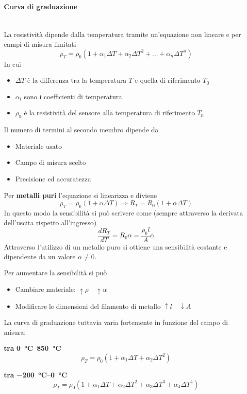 \documentclass[a4paper, 15pt]{article}
\begin{document}
\begin{adjustwidth}{2in}{}
	\paragraph{Curva di graduazione} \mbox{} \\
	La resistività dipende dalla temperatura tramite un'equazione non lineare e per campi di misura limitati
	\[\rho_T = \rho_0(1+\alpha_1\Delta T + \alpha_2 \Delta T^2 + \dots + \alpha_n \Delta T^n)\]
	In cui 
	\begin{itemize}
		\item $\Delta T$ è la differenza tra la temperatura $T$ e quella di riferimento $T_0$
		\item $\alpha_i$ sono i coefficienti di temperatura
		\item $\rho_0$ è la resistività del sensore alla temperatura di riferimento $T_0$
	\end{itemize}
	Il numero di termini al secondo membro dipende da
	\begin{itemize}
		\item Materiale usato
		\item Campo di misura scelto
		\item Precisione ed accuratezza 
	\end{itemize}
	Per \textbf{metalli puri} l'equazione si linearizza e diviene 
	\[\rho_T = \rho_0(1+\alpha\Delta T) \Rightarrow R_T = R_0(1+\alpha\Delta T)\]
\newpage
	In questo modo la sensibilità si può scrivere come (sempre attraverso la derivata dell'uscita rispetto all'ingresso)
	\[\dfrac{dR_T}{dT} = R_0\alpha = \dfrac{\rho_0l}{A}\alpha\]
	Attraverso l'utilizzo di un metallo puro si ottiene una sensibilità costante e dipendente da un valore $\alpha\ne0$.
	
	Per aumentare la sensibilità si può
	\begin{itemize}
		\item Cambiare materiale: \(\uparrow\rho\quad\uparrow\alpha\)
		\item Modificare le dimensioni del filamento di metallo \(\uparrow l\quad\downarrow A\)
	\end{itemize}
	La curva di graduazione tuttavia varia fortemente in funzione del campo di misura:
	
	\textbf{tra \SIrange{0}{850}{\celsius}}
	\[\rho_T = \rho_0(1+\alpha_1\Delta T + \alpha_2 \Delta T^2)\]
	
	\textbf{tra \SIrange{-200}{0}{\celsius}}
	\[\rho_T = \rho_0(1+\alpha_1\Delta T + \alpha_2 \Delta T^2 + \alpha_3 \Delta T^3 + \alpha_4 \Delta T^4)\]
	

\end{adjustwidth}
\end{document}
